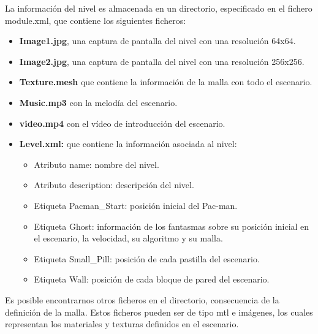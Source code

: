 La información del nivel es almacenada en un directorio, especificado en el fichero module.xml, que contiene los siguientes ficheros:
\begin{itemize}
\item \textbf{Image1.jpg}, una captura de pantalla del nivel con una resolución 64x64.
\item \textbf{Image2.jpg}, una captura de pantalla del nivel con una resolución 256x256.
\item \textbf{Texture.mesh} que contiene la información de la malla con todo el escenario.
\item \textbf{Music.mp3} con la melodía del escenario.
\item \textbf{video.mp4} con el vídeo de introducción del escenario.
\item\textbf{Level.xml:} que contiene la información asociada al nivel:
	\begin{itemize}
	\item Atributo name: nombre del nivel.
	\item Atributo description: descripción del nivel.
	\item Etiqueta Pacman\_Start: posición inicial del Pac-man.
	\item Etiqueta Ghost: información de los fantasmas  sobre su posición inicial en el escenario, la velocidad, su algoritmo y su malla.
	\item Etiqueta Small\_Pill: posición de cada pastilla del escenario.
	\item Etiqueta Wall: posición de cada bloque de pared del escenario.
	\end{itemize}
\end{itemize}

Es posible encontrarnos otros ficheros en el directorio, consecuencia de la definición de la malla. Estos ficheros pueden ser de tipo mtl e imágenes, los cuales  representan los materiales y texturas definidos en el escenario.

